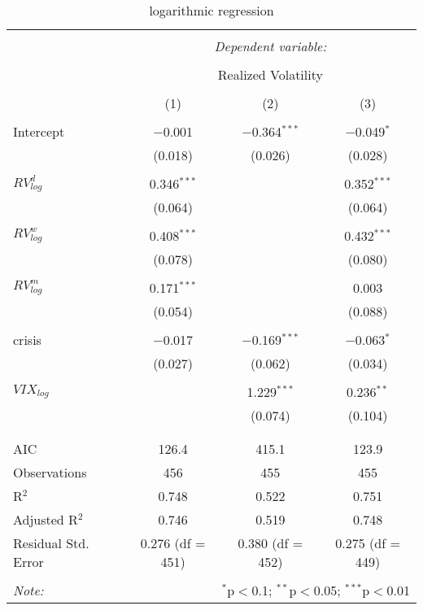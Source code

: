 
\begin{table}[!htbp] \centering 
  \caption{logarithmic regression} 
  \label{} 
\begin{tabular}{@{\extracolsep{5pt}}lccc} 
\\[-1.8ex]\hline 
\hline \\[-1.8ex] 
 & \multicolumn{3}{c}{\textit{Dependent variable:}} \\ 
\cline{2-4} 
\\[-1.8ex] & \multicolumn{3}{c}{Realized Volatility} \\ 
\\[-1.8ex] & (1) & (2) & (3)\\ 
\hline \\[-1.8ex] 
 Intercept & $-$0.001 & $-$0.364$^{***}$ & $-$0.049$^{*}$ \\ 
  & (0.018) & (0.026) & (0.028) \\ 
  & & & \\ 
 $RV^{d}_{log}$ & 0.346$^{***}$ &  & 0.352$^{***}$ \\ 
  & (0.064) &  & (0.064) \\ 
  & & & \\ 
 $RV^{w}_{log}$ & 0.408$^{***}$ &  & 0.432$^{***}$ \\ 
  & (0.078) &  & (0.080) \\ 
  & & & \\ 
 $RV^{m}_{log}$ & 0.171$^{***}$ &  & 0.003 \\ 
  & (0.054) &  & (0.088) \\ 
  & & & \\ 
 crisis & $-$0.017 & $-$0.169$^{***}$ & $-$0.063$^{*}$ \\ 
  & (0.027) & (0.062) & (0.034) \\ 
  & & & \\ 
 $VIX_{log}$ &  & 1.229$^{***}$ & 0.236$^{**}$ \\ 
  &  & (0.074) & (0.104) \\ 
  & & & \\ 
\hline \\[-1.8ex] 
AIC & 126.4 & 415.1 & 123.9 \\ 
Observations & 456 & 455 & 455 \\ 
R$^{2}$ & 0.748 & 0.522 & 0.751 \\ 
Adjusted R$^{2}$ & 0.746 & 0.519 & 0.748 \\ 
Residual Std. Error & 0.276 (df = 451) & 0.380 (df = 452) & 0.275 (df = 449) \\ 
\hline 
\hline \\[-1.8ex] 
\textit{Note:}  & \multicolumn{3}{r}{$^{*}$p$<$0.1; $^{**}$p$<$0.05; $^{***}$p$<$0.01} \\ 
\end{tabular} 
\end{table} 
